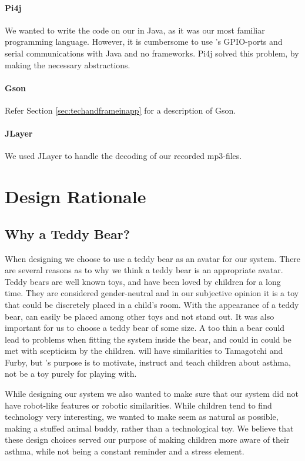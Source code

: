 \paragraph{Pi4j}
We wanted to write the code on our \rpi{} in Java, as it was our most familiar programming language. However, it is cumbersome to use \rpi{}'s GPIO-ports and serial communications with Java and no frameworks. Pi4j solved this problem, by making the necessary abstractions.

\paragraph{Gson}
Refer Section \ref{sec:techandframeinapp} for a description of Gson.    

\paragraph{JLayer}
We used JLayer to handle the decoding of our recorded mp3-files. 

\section{Design Rationale}
\subsection{Why a Teddy Bear?}
When designing \buddy{} we choose to use a teddy bear as an avatar for our system. There are several reasons as to why we think a teddy bear is an appropriate avatar. Teddy bears are well known toys, and have been loved by children for a long time. They are considered gender-neutral\cite{stagnitti1997determining}\cite{cherney2006gender} and in our subjective opinion it is a toy that could be discretely placed in a child's room. With the appearance of a teddy bear, \buddy{} can easily be placed among other toys and not stand out. It was also important for us to choose a teddy bear of some size. A too thin a bear could lead to problems when fitting the system inside the bear, and could in could be met with scepticism by the children. \buddy{} will have similarities to Tamagotchi\cite{tamagotchi} and Furby\cite{furby}, but \buddy{}'s purpose is to motivate, instruct and teach children about asthma, not be a toy purely for playing with. 

While designing our system we also wanted to make sure that our system did not have robot-like features or robotic similarities. While children tend to find technology very interesting, we wanted to make \buddy{} seem as natural as possible, making a stuffed animal buddy, rather than a technological toy. We believe that these design choices served our purpose of making children more aware of their asthma, while not being a constant reminder and a stress element. 

